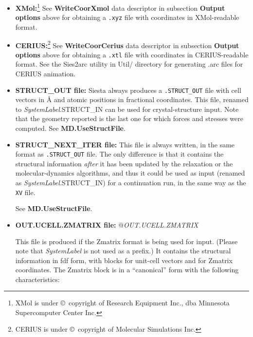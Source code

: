 \documentclass[11pt]{article}
\begin{document}
\begin{itemize}
\item{\bf XMol:}\footnote[1]{XMol is under \copyright\ copyright of Research 
Equipment Inc., dba Minnesota Supercomputer Center Inc.}
See {\bf WriteCoorXmol} data descriptor in subsection {\bf Output options}
above for obtaining a {\tt .xyz} file with coordinates in 
XMol-readable format.

\item{\bf CERIUS:}\footnote[2]{CERIUS is under \copyright\ copyright of 
Molecular Simulations Inc.}
See {\bf WriteCoorCerius} data descriptor in subsection {\bf Output options}
above for obtaining a {\tt .xtl} file with coordinates in 
CERIUS-readable format. See the {\sc Sies2arc}
utility in Util/ directory
for generating .arc files for CERIUS animation.

\item{\bf STRUCT\_OUT file:}
Siesta always produces a {\tt .STRUCT\_OUT} file with cell vectors in {\AA}
and atomic positions in fractional coordinates. This file, renamed to
{\it SystemLabel}.STRUCT\_IN can be used for crystal-structure input.
Note that the geometry reported is the last one for which forces and
stresses were computed.
See {\bf MD.UseStructFile}.

\item{\bf STRUCT\_NEXT\_ITER file:}
This file is always written, in the same format as {\tt .STRUCT\_OUT}
file. The only difference is that it contains the structural
information {\em after} it has been updated by the relaxation or the
molecular-dynamics
algorithms, and thus it could be used as input (renamed as
{\it SystemLabel}.STRUCT\_IN) for a continuation run, in the same way
as the {\tt XV} file.

See {\bf MD.UseStructFile}.

\item{\bf OUT.UCELL.ZMATRIX file:}
@{{\it OUT.UCELL.ZMATRIX}}

This file is produced if the Zmatrix format is being used for
input. (Please note that {\it SystemLabel} is not used as a prefix.)
It contains the structural information in fdf form, with
blocks for unit-cell vectors and for Zmatrix coordinates. The
Zmatrix block is in a ``canonical'' form with the following
characteristics:


\end{itemize}
\end{document}
